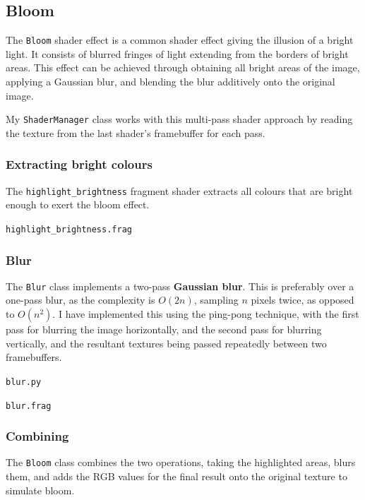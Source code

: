 \documentclass[../main/main.tex]{subfiles}
\begin{document}
\subsection{Bloom}
\label{sec:shader-bloom}
The \lstinline{Bloom} shader effect is a common shader effect giving the illusion of a bright light. It consists of blurred fringes of light extending from the borders of bright areas. This effect can be achieved through obtaining all bright areas of the image, applying a Gaussian blur, and blending the blur additively onto the original image.

My \lstinline{ShaderManager} class works with this multi-pass shader approach by reading the texture from the last shader's framebuffer for each pass.

\subsubsection*{Extracting bright colours}
The \lstinline{highlight_brightness} fragment shader extracts all colours that are bright enough to exert the bloom effect.

\noindent\verb|highlight_brightness.frag|


\subsubsection*{Blur}
The \lstinline{Blur} class implements a two-pass \textbf{Gaussian blur}. This is preferably over a one-pass blur, as the complexity is $O(2n)$, sampling $n$ pixels twice, as opposed to $O(n^2)$. I have implemented this using the ping-pong technique, with the first pass for blurring the image horizontally, and the second pass for blurring vertically, and the resultant textures being passed repeatedly between two framebuffers.

\noindent\verb|blur.py|


\bigskip
\noindent\verb|blur.frag|


\subsubsection*{Combining}
The \lstinline{Bloom} class combines the two operations, taking the highlighted areas, blurs them, and adds the RGB values for the final result onto the original texture to simulate bloom.
\end{document}
